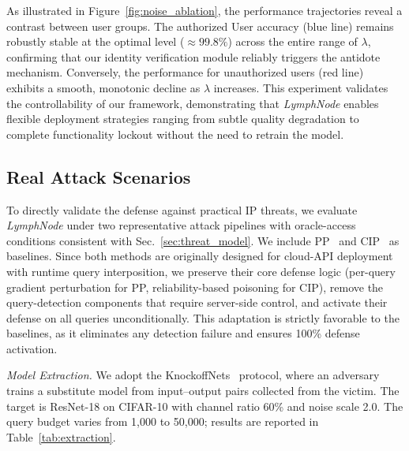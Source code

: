 \documentclass[conference]{IEEEtran}
\begin{document}
As illustrated in Figure~\ref{fig:noise_ablation}, the performance trajectories reveal a contrast between user groups. The authorized User accuracy (blue line) remains robustly stable at the optimal level ($\approx 99.8\%$) across the entire range of $\lambda$, confirming that our identity verification module reliably triggers the antidote mechanism. Conversely, the performance for unauthorized users (red line) exhibits a smooth, monotonic decline as $\lambda$ increases. This experiment validates the controllability of our framework, demonstrating that \textit{LymphNode} enables flexible deployment strategies ranging from subtle quality degradation to complete functionality lockout without the need to retrain the model.

\subsection{Real Attack Scenarios}
\label{Sec:real attack exp}

To directly validate the defense against practical IP threats, we evaluate \textit{LymphNode} under two representative attack pipelines with oracle-access conditions consistent with Sec.~\ref{sec:threat_model}. We include PP~\cite{orekondy2020prediction} and CIP~\cite{zhang2023cip} as baselines. Since both methods are originally designed for cloud-API deployment with runtime query interposition, we preserve their core defense logic (per-query gradient perturbation for PP, reliability-based poisoning for CIP), remove the query-detection components that require server-side control, and activate their defense on all queries unconditionally. This adaptation is strictly favorable to the baselines, as it eliminates any detection failure and ensures 100\% defense activation.

\noindent\textit{Model Extraction.} We adopt the KnockoffNets~\cite{orekondy19knockoff} protocol, where an adversary trains a substitute model from input--output pairs collected from the victim. The target is ResNet-18 on CIFAR-10 with channel ratio 60\% and noise scale 2.0. The query budget varies from 1{,}000 to 50{,}000; results are reported in Table~\ref{tab:extraction}.
\end{document}
